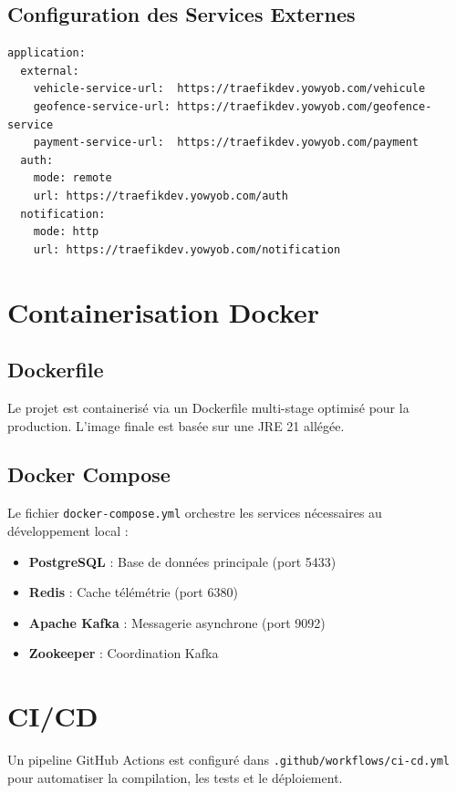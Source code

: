 \documentclass[12pt,a4paper]{report}
\begin{document}
\subsection{Configuration des Services Externes}

\begin{lstlisting}[style=yamlStyle, caption={Configuration des services externes}]
application:
  external:
    vehicle-service-url:  https://traefikdev.yowyob.com/vehicule
    geofence-service-url: https://traefikdev.yowyob.com/geofence-service
    payment-service-url:  https://traefikdev.yowyob.com/payment
  auth:
    mode: remote
    url: https://traefikdev.yowyob.com/auth
  notification:
    mode: http
    url: https://traefikdev.yowyob.com/notification
\end{lstlisting}

\section{Containerisation Docker}

\subsection{Dockerfile}

Le projet est containerisé via un Dockerfile multi-stage optimisé pour la production. L'image finale est basée sur une JRE 21 allégée.

\subsection{Docker Compose}

Le fichier \texttt{docker-compose.yml} orchestre les services nécessaires au développement local :
\begin{itemize}[leftmargin=2cm]
  \item \textbf{PostgreSQL} : Base de données principale (port 5433)
  \item \textbf{Redis} : Cache télémétrie (port 6380)
  \item \textbf{Apache Kafka} : Messagerie asynchrone (port 9092)
  \item \textbf{Zookeeper} : Coordination Kafka
\end{itemize}

\section{CI/CD}

Un pipeline GitHub Actions est configuré dans \texttt{.github/workflows/ci-cd.yml} pour automatiser la compilation, les tests et le déploiement.
\end{document}
